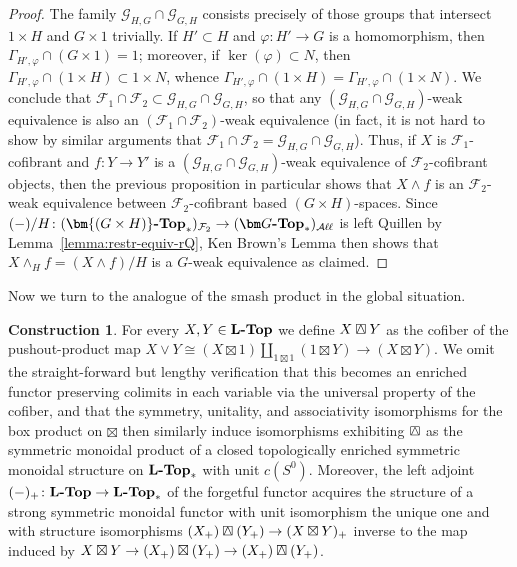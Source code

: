 \documentclass[reqno]{memo-l}
\theoremstyle{mythm}
\theoremstyle{definition}
\newtheorem{constr}[thm]{Construction}
\numberwithin{equation}{section}
\newcommand{\Aa}{{\mathcal{A}}}
\newcommand{\Ff}{{\mathcal{F}}}
\renewcommand{\phi}{\varphi}
\newcommand{\boxsmash}{\mathbin{\raise.5pt\hbox{\rlap{\lower.5pt\hbox{$\square$}}\kern.55pt$\smashp$\kern.55pt}}}
\newcommand{\cat}[1]{\textbf{\textup{#1}}}
\newcommand{\consto}{\ensuremath{c}}
\newcommand{\bigAll}{\hbox{\hfuzz=20pt\hbox{$\mathcal A\kern-.3pt$}\setbox0=\hbox{$\ell\kern-.75pt\ell$}\hbox to 0pt{\hfuzz=8pt\kern-.075pt\unhcopy0}\hbox to 0pt{\hfuzz=8pt\kern.075pt\unhcopy0}\box0\kern.05pt}}
\newcommand{\smallAll}{\Aa\kern-.3pt\ell\kern-.6pt\ell}
\newcommand{\All}{\mathchoice{\bigAll}{\bigAll}{\smallAll}{\smallAll}}
\let\smashp=\wedge
\begin{document}
\begin{proof}
    The family $\mathcal G_{H,G}\cap\mathcal G_{G,H}$ consists precisely of those groups that intersect $1\times H$ and $G\times 1$ trivially. If $H'\subset H$ and $\phi\colon H'\to G$ is a homomorphism, then $\Gamma_{H',\phi}\cap(G\times1)=1$; moreover, if $\ker(\phi)\subset N$, then $\Gamma_{H',\phi}\cap (1\times H)\subset 1\times N$, whence $\Gamma_{H',\phi}\cap (1\times H)=\Gamma_{H',\phi}\cap (1\times N)$. We conclude that $\Ff_1\cap\Ff_2\subset \mathcal G_{H,G}\cap\mathcal G_{G,H}$, so that any $(\mathcal G_{H,G}\cap\mathcal G_{G,H})$-weak equivalence is also an $(\Ff_1\cap\Ff_2)$-weak equivalence (in fact, it is not hard to show by similar arguments that $\Ff_1\cap\Ff_2=\mathcal G_{H,G}\cap\mathcal G_{G,H}$). Thus, if $X$ is $\Ff_1$-cofibrant and $f\colon Y\to Y'$ is a $(\mathcal G_{H,G}\cap\mathcal G_{G,H})$-weak equivalence of $\Ff_2$-cofibrant objects, then the previous proposition in particular shows that $X\smashp f$ is an $\Ff_2$-weak equivalence between $\Ff_2$-cofibrant based $(G\times H)$-spaces. Since $(-)/H\colon (\cat{$\bm{(G\times H)}$-Top}_*)_{\Ff_2}\to(\cat{$\bm G$-Top}_*)_{\All}$ is left Quillen by Lemma~\ref{lemma:restr-equiv-rQ}, Ken Brown's Lemma then shows that $X\smashp_Hf=(X\smashp f)/H$ is a $G$-weak equivalence as claimed.
\end{proof}

Now we turn to the analogue of the smash product in the global situation. 

\begin{constr}
    For every $X,Y\in\cat{$\cat{L}$-Top}$ we define $X\boxsmash Y$ as the cofiber of the pushout-product map $X\vee Y\cong(X\boxtimes 1)\amalg_{1\boxtimes 1}(1\boxtimes Y)\to (X\boxtimes Y)$. We omit the straight-forward but lengthy verification that this becomes an enriched functor preserving colimits in each variable via the universal property of the cofiber, and that the symmetry, unitality, and associativity isomorphisms for the box product on $\boxtimes$ then similarly induce isomorphisms exhibiting $\boxsmash$ as the symmetric monoidal product of a closed topologically enriched symmetric monoidal structure on $\cat{$\cat{L}$-Top}_*$ with unit $\consto(S^0)$. Moreover, the left adjoint $(-)_+\colon\cat{$\cat{L}$-Top}\to\cat{$\cat{L}$-Top}_*$ of the forgetful functor acquires the structure of a strong symmetric monoidal functor with unit isomorphism the unique one and with structure isomorphisms $(X_+)\boxsmash(Y_+)\to (X\boxtimes Y)_+$ inverse to the map induced by $X\boxtimes Y\to (X_+)\boxtimes(Y_+)\to (X_+)\boxsmash(Y_+)$.
\end{constr}
\end{document}
